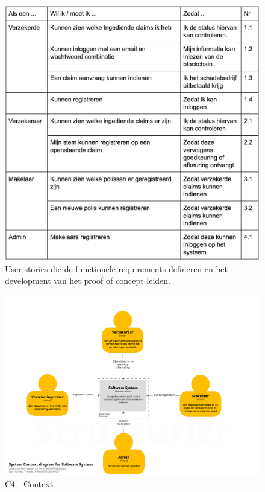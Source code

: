 \begin{figure}[h!]
    \begin{center}
        \includegraphics[scale=0.7]{images/userstories}
        \caption{User stories die de functionele requirements defineren en het development van het proof of concept leiden.}
        \label{fig:userstories}
    \end{center}
\end{figure}

\newpage

\begin{figure}[h!]
    \begin{center}
        \includegraphics[width=\paperwidth-100]{images/context}
        \caption{C4 - Context.}
        \label{fig:c4Context}
    \end{center}
\end{figure}


